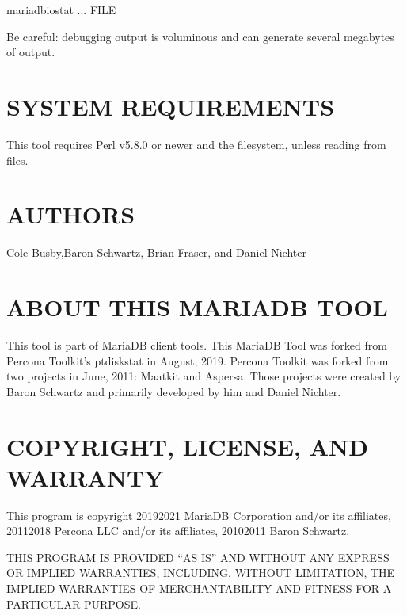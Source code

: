 \documentclass[letterpaper,10pt,english]{sphinxmanual}
\begin{document}
\begin{sphinxVerbatim}[commandchars=\\\{\}]
 mariadb\PYGZhy{}iostat ... \PYGZgt{} FILE \PYGZgt{}
\end{sphinxVerbatim}

\sphinxAtStartPar
Be careful: debugging output is voluminous and can generate several megabytes
of output.


\section{SYSTEM REQUIREMENTS}
\label{\detokenize{mariadb-iostat:system-requirements}}
\sphinxAtStartPar
This tool requires Perl v5.8.0 or newer and the  filesystem, unless
reading from files.


\section{AUTHORS}
\label{\detokenize{mariadb-iostat:authors}}
\sphinxAtStartPar
Cole Busby,Baron Schwartz, Brian Fraser, and Daniel Nichter


\section{ABOUT THIS MARIADB TOOL}
\label{\detokenize{mariadb-iostat:about-this-mariadb-tool}}
\sphinxAtStartPar
This tool is part of MariaDB client tools. This MariaDB Tool was forked from
Percona Toolkit’s pt\sphinxhyphen{}diskstat in August, 2019. Percona Toolkit was forked from two
projects in June, 2011: Maatkit and Aspersa.  Those projects were created by
Baron Schwartz and primarily developed by him and Daniel Nichter.


\section{COPYRIGHT, LICENSE, AND WARRANTY}
\label{\detokenize{mariadb-iostat:copyright-license-and-warranty}}
\sphinxAtStartPar
This program is copyright 2019\sphinxhyphen{}2021 MariaDB Corporation and/or its affiliates,
2011\sphinxhyphen{}2018 Percona LLC and/or its affiliates, 2010\sphinxhyphen{}2011 Baron Schwartz.

\sphinxAtStartPar
THIS PROGRAM IS PROVIDED “AS IS” AND WITHOUT ANY EXPRESS OR IMPLIED
WARRANTIES, INCLUDING, WITHOUT LIMITATION, THE IMPLIED WARRANTIES OF
MERCHANTABILITY AND FITNESS FOR A PARTICULAR PURPOSE.
\end{document}
